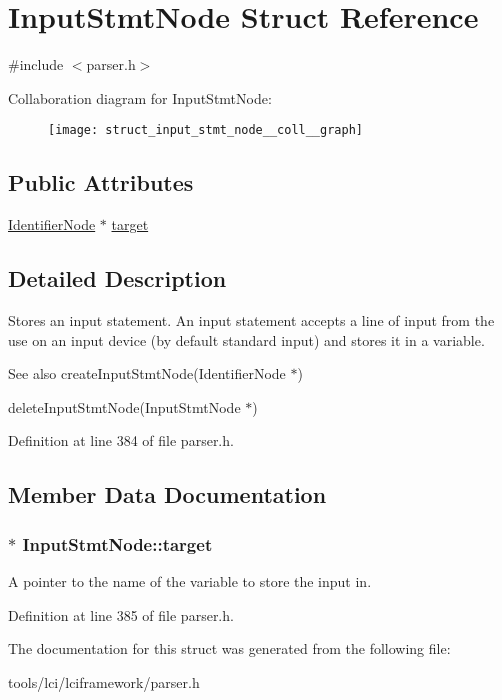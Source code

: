 \hypertarget{struct_input_stmt_node}{\section{Input\-Stmt\-Node Struct Reference}
\label{struct_input_stmt_node}
}


{\ttfamily \#include $<$parser.\-h$>$}



Collaboration diagram for Input\-Stmt\-Node\-:
\nopagebreak
\begin{figure}[H]
\begin{center}
\leavevmode
\texttt{[image: struct\_input\_stmt\_node\_\_coll\_\_graph]}
\end{center}
\end{figure}
\subsection*{Public Attributes}
\begin{DoxyCompactItemize}
\item 
\hyperlink{struct_identifier_node}{Identifier\-Node} $\ast$ \hyperlink{struct_input_stmt_node_ad7cb247683faf94a9da01d08055349f2}{target}
\end{DoxyCompactItemize}


\subsection{Detailed Description}
Stores an input statement. An input statement accepts a line of input from the use on an input device (by default standard input) and stores it in a variable.

\begin{DoxySeeAlso}{See also}
create\-Input\-Stmt\-Node(\-Identifier\-Node $\ast$) 

delete\-Input\-Stmt\-Node(\-Input\-Stmt\-Node $\ast$) 
\end{DoxySeeAlso}


Definition at line 384 of file parser.\-h.



\subsection{Member Data Documentation}
\hypertarget{struct_input_stmt_node_ad7cb247683faf94a9da01d08055349f2}{
\subsubsection[{target}]{$\ast$ {\bf Input\-Stmt\-Node\-::target}}}\label{struct_input_stmt_node_ad7cb247683faf94a9da01d08055349f2}
A pointer to the name of the variable to store the input in. 

Definition at line 385 of file parser.\-h.



The documentation for this struct was generated from the following file\-:\begin{DoxyCompactItemize}
\item 
tools/lci/lciframework/parser.\-h\end{DoxyCompactItemize}
